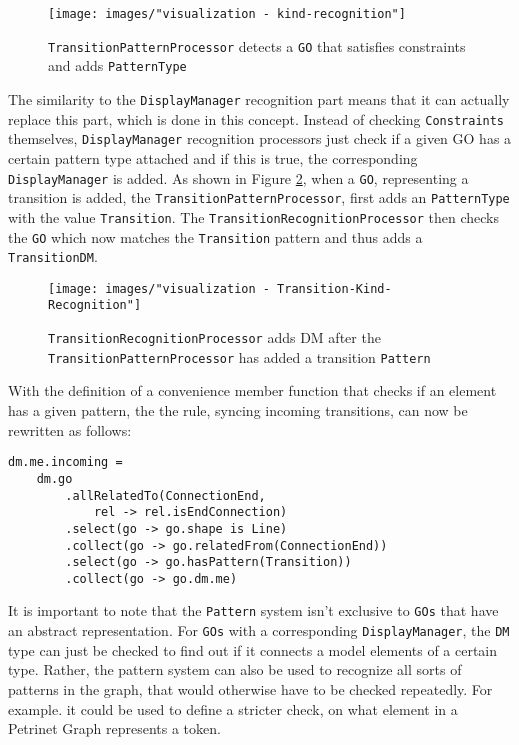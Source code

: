 \begin{figure}
  \centering
  \texttt{[image: images/"visualization - kind-recognition"]}
  \caption{\texttt{TransitionPatternProcessor} detects a \texttt{GO} that satisfies constraints and adds \texttt{PatternType}}
  \label{fig:kind-recognition}
\end{figure}

The similarity to the \texttt{DisplayManager} recognition part means that it can actually replace this part, which is done in this concept. Instead of checking \texttt{Constraints} themselves, \texttt{DisplayManager} recognition processors just check if a given GO has a certain pattern type attached and if this is true, the corresponding \texttt{DisplayManager} is added. As shown in Figure \ref{fig:Transition-Kind-Recognition}, when a \texttt{GO}, representing a transition is added, the \texttt{TransitionPatternProcessor}, first adds an \texttt{PatternType} with the value \texttt{Transition}. The \texttt{TransitionRecognitionProcessor} then checks the \texttt{GO} which now matches the \texttt{Transition} pattern and thus adds a \texttt{TransitionDM}.

\begin{figure}[ht]
  \centering
  \texttt{[image: images/"visualization - Transition-Kind-Recognition"]}
  \caption{\texttt{TransitionRecognitionProcessor} adds DM after the \texttt{TransitionPatternProcessor} has added a transition \texttt{Pattern}}
  \label{fig:Transition-Kind-Recognition}
\end{figure}

With the definition of a convenience member function that checks if an element has a given pattern, the the rule, syncing incoming transitions, can now be rewritten as follows:
\begin{lstlisting}[captionpos=b,caption={Improved incoming transition rule, that also filters for elements with a that match the \texttt{Transition} pattern.}]
dm.me.incoming = 
    dm.go
        .allRelatedTo(ConnectionEnd,
            rel -> rel.isEndConnection)
        .select(go -> go.shape is Line)
        .collect(go -> go.relatedFrom(ConnectionEnd))
        .select(go -> go.hasPattern(Transition))
        .collect(go -> go.dm.me)
\end{lstlisting}


It is important to note that the \texttt{Pattern} system isn't exclusive to \texttt{GOs} that have an abstract representation. For \texttt{GOs} with a corresponding \texttt{DisplayManager}, the \texttt{DM} type can just be checked to find out if it connects a model elements of a certain type. Rather, the pattern system can also be used to recognize all sorts of patterns in the graph, that would otherwise have to be checked repeatedly. For example. it could be used to define a stricter check, on what element in a Petrinet Graph represents a token.

